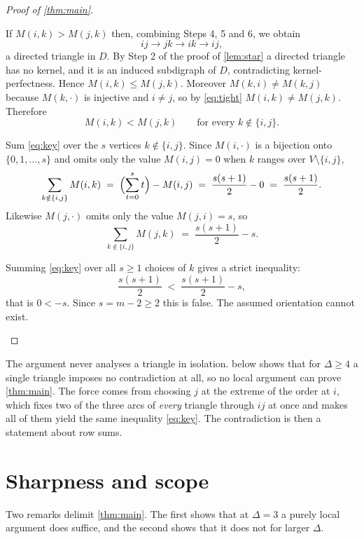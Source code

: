 \documentclass[11pt]{article}
\numberwithin{equation}{section}
\theoremstyle{plain}
\begin{document}
\begin{proof}[Proof of \cref{thm:main}]
\begin{steps}
\item If $M(i,k)>M(j,k)$ then, combining Steps 4, 5 and 6, we obtain
\[
  ij\longrightarrow jk\longrightarrow ik\longrightarrow ij ,
\]
a directed triangle in $D$. By Step 2 of the proof of \cref{lem:star} a directed triangle has
no kernel, and it is an induced subdigraph of $D$, contradicting kernel-perfectness. Hence
$M(i,k)\le M(j,k)$. Moreover $M(k,i)\ne M(k,j)$ because $M(k,\cdot)$ is injective and
$i\ne j$, so by \eqref{eq:tight} $M(i,k)\ne M(j,k)$. Therefore
\begin{equation}\label{eq:key}
  M(i,k)<M(j,k)\qquad\text{for every } k\notin\{i,j\}.
\end{equation}

\item Sum \eqref{eq:key} over the $s$ vertices $k\notin\{i,j\}$. Since $M(i,\cdot)$ is a
bijection onto $\{0,1,\dots,s\}$ and omits only the value $M(i,j)=0$ when $k$ ranges over
$V\setminus\{i,j\}$,
\[
  \sum_{k\notin\{i,j\}}M(i,k)\;=\;\Bigl(\sum_{t=0}^{s}t\Bigr)-M(i,j)
  \;=\;\frac{s(s+1)}{2}-0\;=\;\frac{s(s+1)}{2}.
\]
Likewise $M(j,\cdot)$ omits only the value $M(j,i)=s$, so
\[
  \sum_{k\notin\{i,j\}}M(j,k)\;=\;\frac{s(s+1)}{2}-s .
\]

\item Summing \eqref{eq:key} over all $s\ge 1$ choices of $k$ gives a strict inequality:
\[
  \frac{s(s+1)}{2}\;<\;\frac{s(s+1)}{2}-s ,
\]
that is $0<-s$. Since $s=m-2\ge 2$ this is false. The assumed orientation cannot exist. \qedhere
\end{steps}
\end{proof}

\begin{remark}\label{rem:where-force}
The argument never analyses a triangle in isolation.  below shows that for
$\Delta\ge 4$ a single triangle imposes no contradiction at all, so no local argument can
prove \cref{thm:main}. The force comes from choosing $j$ at the extreme of the order at $i$,
which fixes two of the three arcs of \emph{every} triangle through $ij$ at once and makes all
of them yield the same inequality \eqref{eq:key}. The contradiction is then a statement about
row sums.
\end{remark}

\section{Sharpness and scope}\label{sec:scope}

Two remarks delimit \cref{thm:main}. The first shows that at $\Delta=3$ a purely local
argument does suffice, and the second shows that it does not for larger $\Delta$.
\end{document}
